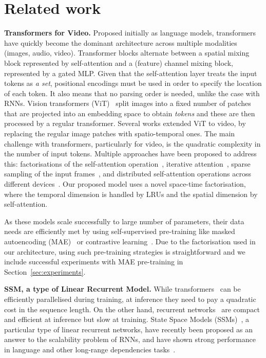 

\section{Related work}
\label{sec:related}

\textbf{Transformers for Video.}
Proposed initially as language models, transformers~\cite{vaswani2017attention} have quickly become the dominant architecture across multiple modalities (images, audio, video).  Transformer blocks alternate between a spatial mixing block represented by self-attention and a (feature) channel mixing block, represented by a gated MLP. Given that the self-attention layer treats the input tokens as \emph{a set}, positional encodings must be used in order to specify the location of each token. It also means that no parsing order is needed, unlike the case with RNNs. Vision transformers (ViT)~\cite{dosovitskiy2021an,Liu_2021_ICCV} split images into a fixed number of patches that are projected into an embedding space to obtain \textit{tokens} and these are then processed by a regular transformer. 
Several works extended ViT to video, \eg by replacing the regular image patches with spatio-temporal ones. The main challenge with transformers, particularly for video, is the quadratic complexity in the number of input tokens. Multiple approaches have been proposed to address this: \eg factorisations of the self-attention operation~\citep{vivit,pmlr-v139-bertasius21a}, iterative attention~\cite{jaegle2022perceiver}, sparse sampling of the input frames~\cite{tubevit}, and  distributed self-attention operations across different devices~\cite{liu2024ringattention}. 
Our proposed model uses a novel space-time factorisation, where the temporal dimension is handled by LRUs and the spatial dimension by self-attention. 

As these models scale successfully to large number of parameters, their data needs are efficiently met by using self-supervised pre-training like masked autoencoding (MAE)~\cite{tong2022videomae} or contrastive learning~\cite{pmlr-v235-zhao24f}. Due to the factorisation used in our architecture, using such pre-training strategies is straightforward and we include successful experiments with MAE pre-training in Section~\ref{sec:experiments}.

\vspace{1mm}

\noindent\textbf{SSM, a type of Linear Recurrent Model.} While transformers~\cite{vaswani2017attention} can be efficiently parallelised during training, at inference they need to pay a quadratic cost in the sequence length. On the other hand, recurrent networks~\cite{elman1990finding,hochreiter1997long,Mikolov2010,bahdanau2014neural,sutskever2014sequence} are compact and efficient at inference but slow at training. State Space Models (SSMs)~\cite{gu2020hippo, gu2021efficiently, orvieto2023resurrecting}, a particular type of linear recurrent networks, have recently been proposed as an answer to the scalability problem of RNNs, and have shown strong performance in language and other long-range dependencies tasks~\cite{de2024griffinmixinggatedlinear, gu2023mamba}. 

